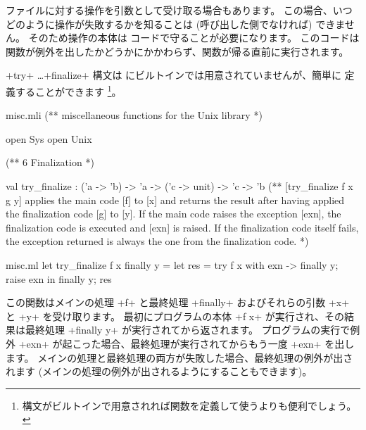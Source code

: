 ファイルに対する操作を引数として受け取る場合もあります。
この場合、いつどのように操作が失敗するかを知ることは (呼び出した側でなければ) できません。
そのため操作の本体は  コードで守ることが必要になります。
このコードは関数が例外を出したかどうかにかかわらず、関数が帰る直前に実行されます。

\ml+try+ \ldots \ml+finalize+ 構文は \ocaml にビルトインでは用意されていませんが、簡単に
定義することができます \footnote{構文がビルトインで用意されれば関数を定義して使うよりも便利でしょう。}。
\begin{codefile}{misc.mli}
(** miscellaneous functions for the Unix library *)

open Sys
open Unix

(** {6 Finalization} *)

val try_finalize : ('a -> 'b) -> 'a -> ('c -> unit) -> 'c -> 'b
(** [try_finalize f x g y] applies the main code [f] to [x] and
   returns the result after having applied the finalization
   code [g] to [y]. If the main code raises the exception
   [exn], the finalization code is executed and [exn] is raised.
   If the finalization code itself fails, the exception
   returned is always the one from the finalization code. *)
\end{codefile}
%
\begin{listingcodefile}{misc.ml}
let try_finalize f x finally y =
  let res = try f x with exn -> finally y; raise exn in
  finally y;
  res
\end{listingcodefile}
%
この関数はメインの処理 \ml+f+ と最終処理 \ml+finally+ およびそれらの引数 \ml+x+ と \ml+y+ を受け取ります。
最初にプログラムの本体 \ml+f x+ が実行され、その結果は最終処理 \ml+finally y+ が実行されてから返されます。
プログラムの実行で例外 \ml+exn+ が起こった場合、最終処理が実行されてからもう一度 \ml+exn+ を出します。
メインの処理と最終処理の両方が失敗した場合、最終処理の例外が出されます
(メインの処理の例外が出されるようにすることもできます)。

